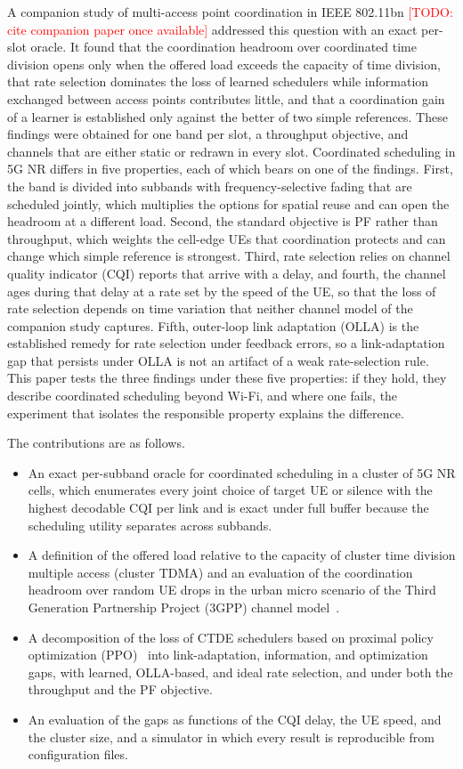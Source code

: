 \documentclass{ieeeaccess}
\newcommand{\todo}[1]{\textcolor{red}{[TODO: #1]}}
\begin{document}
A companion study of multi-access point coordination in IEEE 802.11bn \todo{cite companion paper once available} addressed this question with an exact per-slot oracle. It found that the coordination headroom over coordinated time division opens only when the offered load exceeds the capacity of time division, that rate selection dominates the loss of learned schedulers while information exchanged between access points contributes little, and that a coordination gain of a learner is established only against the better of two simple references. These findings were obtained for one band per slot, a throughput objective, and channels that are either static or redrawn in every slot. Coordinated scheduling in 5G NR differs in five properties, each of which bears on one of the findings. First, the band is divided into subbands with frequency-selective fading that are scheduled jointly, which multiplies the options for spatial reuse and can open the headroom at a different load. Second, the standard objective is PF rather than throughput, which weights the cell-edge UEs that coordination protects and can change which simple reference is strongest. Third, rate selection relies on channel quality indicator (CQI) reports that arrive with a delay, and fourth, the channel ages during that delay at a rate set by the speed of the UE, so that the loss of rate selection depends on time variation that neither channel model of the companion study captures. Fifth, outer-loop link adaptation (OLLA) is the established remedy for rate selection under feedback errors, so a link-adaptation gap that persists under OLLA is not an artifact of a weak rate-selection rule. This paper tests the three findings under these five properties: if they hold, they describe coordinated scheduling beyond Wi-Fi, and where one fails, the experiment that isolates the responsible property explains the difference.

The contributions are as follows.
\begin{itemize}
\item An exact per-subband oracle for coordinated scheduling in a cluster of 5G NR cells, which enumerates every joint choice of target UE or silence with the highest decodable CQI per link and is exact under full buffer because the scheduling utility separates across subbands.
\item A definition of the offered load relative to the capacity of cluster time division multiple access (cluster TDMA) and an evaluation of the coordination headroom over random UE drops in the urban micro scenario of the Third Generation Partnership Project (3GPP) channel model~\cite{3gpp38901}.
\item A decomposition of the loss of CTDE schedulers based on proximal policy optimization (PPO)~\cite{schulman2017ppo,yu2022mappo} into link-adaptation, information, and optimization gaps, with learned, OLLA-based, and ideal rate selection, and under both the throughput and the PF objective.
\item An evaluation of the gaps as functions of the CQI delay, the UE speed, and the cluster size, and a simulator in which every result is reproducible from configuration files.
\end{itemize}
\end{document}
